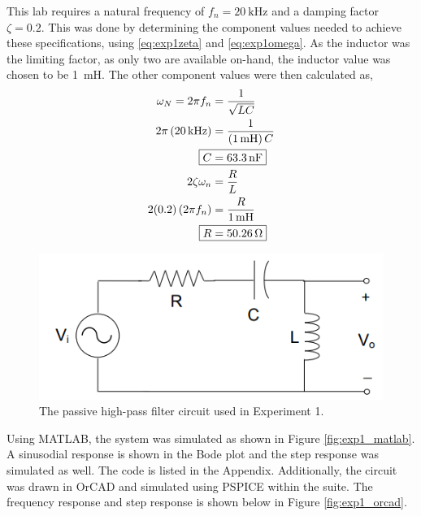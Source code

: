 \documentclass{report}
\begin{document}
\noindent This lab requires a natural frequency of $f_n = \SI{20}{\kHz}$ and a damping factor $\zeta = 0.2$. This was done by determining the component values needed to achieve these specifications, using \eqref{eq:exp1zeta} and \eqref{eq:exp1omega}. As the inductor was the limiting factor, as only two are available on-hand, the inductor value was chosen to be \SI{1}{\milli\henry}. The other component values were then calculated as,
\begin{align*}
	\omega_N = 2 \pi f_n & = \frac{1}{\sqrt{LC}}  \\
		2\pi \left( \SI{20}{\kHz}\right)& = \frac{1}{\left(\SI{1}{\milli\henry}\right) C} \\
	\Aboxed{ C & = \SI{63.3}{\nano\farad}} \\
	2 \zeta \omega_n & = \frac{R}{L} \\
		2 (0.2) \left(2 \pi f_n\right) & = \frac{R}{\SI{1}{\milli\henry}} \\
		\Aboxed{ R & = \SI{50.26}{\ohm} }
\end{align*}
\begin{figure}[h]
	\centering
	\includegraphics[width=0.4\linewidth]{exp1_ckt}
	\caption{The passive high-pass filter circuit used in Experiment 1.}
	\label{fig:exp1ckt}
\end{figure}
\noindent Using MATLAB, the system was simulated as shown in Figure \ref{fig:exp1_matlab}. A sinusodial response is shown in the Bode plot and the step response was simulated as well. The code is listed in the Appendix. Additionally, the circuit was drawn in OrCAD and simulated using PSPICE within the suite. The frequency response and step response is shown below in Figure \ref{fig:exp1_orcad}.
\end{document}
